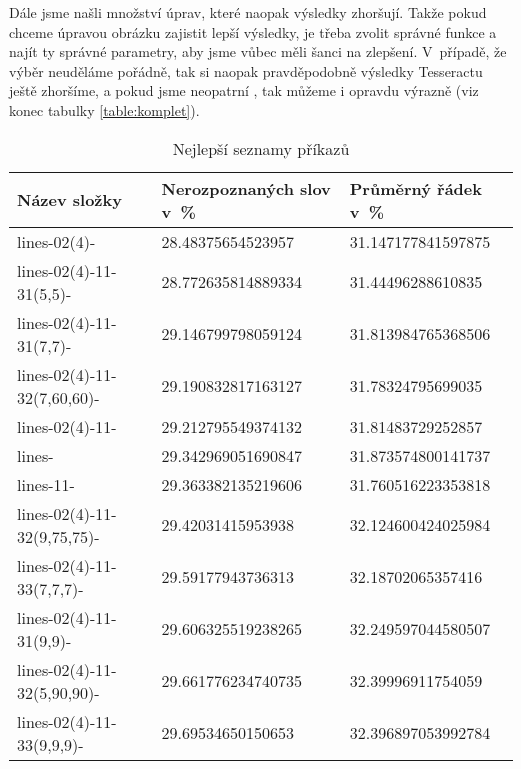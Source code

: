 \documentclass[12pt]{report}			%
\begin{document}
	Dále jsme našli množství úprav, které naopak výsledky zhoršují. Takže pokud chceme úpravou obrázku zajistit lepší výsledky, je třeba zvolit správné funkce a najít ty správné parametry, aby jsme vůbec měli šanci na zlepšení. V~případě, že výběr neuděláme pořádně, tak si naopak pravděpodobně výsledky Tesseractu ještě zhoršíme, a pokud jsme neopatrní , tak můžeme i opravdu výrazně (\gls{viz} konec tabulky \ref{table:komplet}).
\begin{table}[h]
\begin{tabular}{|l|l|l|}
\hline
Název složky                & Nerozpoznaných slov  v~\% & Průměrný řádek v~\% \\ \hline
lines-02(4)-                 & 28.48375654523957         & 31.147177841597875 \\ \hline
lines-02(4)-11-31(5,5)-     & 28.772635814889334        & 31.44496288610835  \\ \hline
lines-02(4)-11-31(7,7)-     & 29.146799798059124        & 31.813984765368506 \\ \hline
lines-02(4)-11-32(7,60,60)- & 29.190832817163127        & 31.78324795699035  \\ \hline
lines-02(4)-11-             & 29.212795549374132        & 31.81483729252857  \\ \hline
lines-                      & 29.342969051690847        & 31.873574800141737 \\ \hline
lines-11- & 29.363382135219606 & 31.760516223353818 \\ \hline
lines-02(4)-11-32(9,75,75)- & 29.42031415953938         & 32.124600424025984 \\ \hline
lines-02(4)-11-33(7,7,7)-  & 29.59177943736313         & 32.18702065357416  \\ \hline
lines-02(4)-11-31(9,9)-     & 29.606325519238265        & 32.249597044580507 \\ \hline
lines-02(4)-11-32(5,90,90)- & 29.661776234740735        & 32.39996911754059  \\ \hline
lines-02(4)-11-33(9,9,9)-   & 29.69534650150653         & 32.396897053992784 \\ \hline
\end{tabular}
\caption{Nejlepší  seznamy příkazů}
\label{table:nejlepsi}
\end{table}
	
	\appendix
\end{document}
